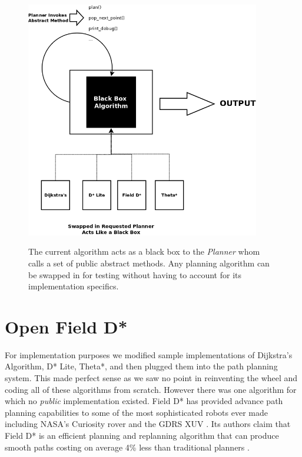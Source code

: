 \begin{figure}[htbp]

\center \includegraphics[width=290pt]{illustrations/abstraction}\\
\caption{The current algorithm acts as a black box to the \textit{Planner} whom calls a set of public abstract methods. Any planning algorithm can be swapped in for testing without having to account for its implementation specifics.} 
\label{abstraction_method}

\end{figure}


\newpage

\section{Open Field D*}
\noindent
For implementation purposes we modified sample implementations of Dijkstra's Algorithm, D* Lite, Theta*, and then plugged them into the path planning system. This made perfect sense as we saw no point in reinventing the wheel and coding all of these algorithms from scratch. However there was one algorithm for which no \textit{public} implementation existed. Field D* has provided advance path planning capabilities to some of the most sophisticated robots ever made including NASA's Curiosity rover and the GDRS XUV \cite{FIELD}. Its authors claim that Field D* is an efficient planning and replanning algorithm that can produce smooth paths costing on average 4\% less than traditional planners \cite{FIELD}. \\

